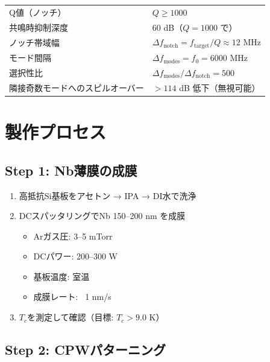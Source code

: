 \documentclass[12pt,a4paper]{article}
\begin{document}
\begin{specbox}[フィルタ性能]
\begin{tabular}{ll}
Q値（ノッチ） & $Q \geq 1000$ \\
共鳴時抑制深度 & 60 dB（$Q = 1000$ で） \\
ノッチ帯域幅 & $\Delta f_{\mathrm{notch}} = f_{\mathrm{target}}/Q \approx 12$ MHz \\
モード間隔 & $\Delta f_{\mathrm{modes}} = f_0 = 6000$ MHz \\
選択性比 & $\Delta f_{\mathrm{modes}}/\Delta f_{\mathrm{notch}} = 500$ \\
隣接奇数モードへのスピルオーバー & $> 114$ dB 低下（無視可能） \\
\end{tabular}
\end{specbox}

\section{製作プロセス}

\subsection{Step 1: Nb薄膜の成膜}

\begin{enumerate}
\item 高抵抗Si基板をアセトン → IPA → DI水で洗浄
\item DCスパッタリングでNb 150--200 nm を成膜
  \begin{itemize}
  \item Arガス圧: 3--5 mTorr
  \item DCパワー: 200--300 W
  \item 基板温度: 室温
  \item 成膜レート: ~1 nm/s
  \end{itemize}
\item $T_c$を測定して確認（目標: $T_c > 9.0$ K）
\end{enumerate}

\subsection{Step 2: CPWパターニング}
\end{document}
